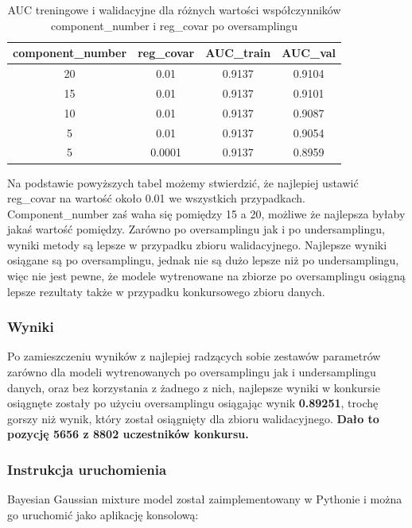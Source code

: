 \documentclass[12pt]{article}
\begin{document}
\begin{table}[h]
    \centering
    \begin{tabular}{|c|c|c|c|}
    \hline
        component\_number & reg\_covar & AUC\_train & AUC\_val \\ \hline
        20 & 0.01 & 0.9137 & 0.9104 \\ \hline 
        15 & 0.01 & 0.9137 & 0.9101 \\ \hline 
        10 & 0.01 & 0.9137 & 0.9087 \\ \hline 
        5 & 0.01 & 0.9137 & 0.9054 \\ \hline 
        5 & 0.0001 & 0.9137 & 0.8959 \\ \hline 
    \end{tabular}
    \caption{AUC treningowe i walidacyjne dla różnych wartości współczynników component\_number i reg\_covar po oversamplingu}
    \label{tab:gaussian_mix_gridsearch_oversampling}
\end{table}

Na podstawie powyższych tabel możemy stwierdzić, że najlepiej ustawić reg\_covar na wartość około 0.01 we wszystkich przypadkach. Component\_number zaś waha się pomiędzy 15 a 20, możliwe że najlepsza byłaby jakaś wartość pomiędzy. Zarówno po oversamplingu jak i po undersamplingu, wyniki metody są lepsze w przypadku zbioru walidacyjnego. Najlepsze wyniki osiągane są po oversamplingu, jednak nie są dużo lepsze niż po undersamplingu, więc nie jest pewne, że modele wytrenowane na zbiorze po oversamplingu osiągną lepsze rezultaty także w przypadku konkursowego zbioru danych. 

\subsubsection{Wyniki}

Po zamieszczeniu wyników z najlepiej radzących sobie zestawów parametrów zarówno dla modeli wytrenowanych po oversamplingu jak i undersamplingu danych, oraz bez korzystania z żadnego z nich, najlepsze wyniki w konkursie osiągnęte zostały po użyciu oversamplingu osiągając wynik \textbf{0.89251}, trochę gorszy niż wynik, który został osiągnięty dla zbioru walidacyjnego. \textbf{Dało to pozycję 5656 z 8802 uczestników konkursu.}

\subsubsection{Instrukcja uruchomienia}

Bayesian Gaussian mixture model został zaimplementowany w Pythonie i można go uruchomić jako aplikację konsolową:
\end{document}
